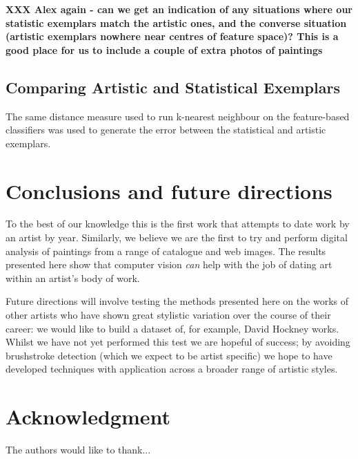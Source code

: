 \documentclass[conference,a4paper]{IEEEtran}
\begin{document}
\textbf{XXX Alex again - can we get an indication of any situations where our statistic exemplars match the artistic ones, and the converse situation (artistic exemplars nowhere near centres of feature space)? This is a good place for us to include a couple of extra photos of paintings}

\subsection{Comparing Artistic and Statistical Exemplars}

The same distance measure used to run k-nearest neighbour on the feature-based classifiers was
used to generate the error between the statistical and artistic exemplars.



\section{Conclusions and future directions}

To the best of our knowledge this is the first work that attempts to date work
by an artist by year. Similarly, we believe we are the first to try and perform
digital analysis of paintings from a range of catalogue and web images. The
results presented here show that computer vision \emph{can} help with the job
of dating art within an artist's body of work. 

Future directions will involve testing the methods presented here on the works
of other artists who have shown great stylistic variation over the course of
their career: we would like to build a dataset of, for example, David Hockney
works.  Whilst we have not yet performed this test we are hopeful of success;
by avoiding brushstroke detection (which we expect to be artist specific) we
hope to have developed techniques with application across a broader range of
artistic styles. 





\section*{Acknowledgment}


The authors would like to thank...
\end{document}
